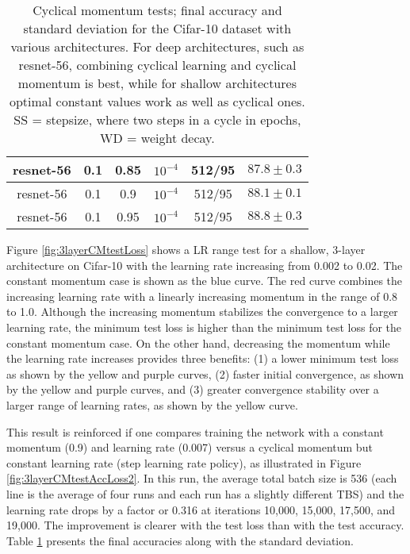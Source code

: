 \documentclass{article} %
\begin{document}
\begin{table}[tb]
\begin{center}
\begin{tabular}{| c | c | c | c | c | c | }
			resnet-56  & 0.1  & 0.85 & $ 10^{-4} $ & 512/95 & $ 87.8 \pm 0.3 $   \\ \hline
			resnet-56  & 0.1  & 0.9 & $ 10^{-4} $ & 512/95 & $ 88.1 \pm 0.1 $   \\ \hline
			resnet-56  & 0.1  & 0.95 & $ 10^{-4} $ & 512/95 & $ 88.8 \pm 0.3 $   \\ \hline
		\end{tabular}
		\caption{Cyclical momentum tests; final accuracy and standard deviation for the Cifar-10 dataset with various architectures. For deep architectures, such as resnet-56, combining cyclical learning and cyclical momentum is best, while for shallow architectures optimal constant values work as well as cyclical ones.   SS = stepsize, where two steps in a cycle in epochs, WD = weight decay. }
		\label{tab1:CMcifar}
		\vspace{-20pt}
	\end{center}
	\vspace{-5pt}
\end{table}

Figure \ref{fig:3layerCMtestLoss} shows a LR range test for a shallow, 3-layer architecture on Cifar-10 with the learning rate increasing from 0.002 to 0.02.  The constant momentum case is shown as the blue curve.  The red curve combines the increasing learning rate with a linearly increasing momentum in the range of 0.8 to 1.0.  Although the increasing momentum stabilizes the convergence to a larger learning rate, the minimum test loss is higher than the minimum test loss for the constant momentum case.  On the other hand, decreasing the momentum while the learning rate increases provides three benefits: (1) a lower minimum test loss as shown by the yellow and purple curves, (2) faster initial convergence, as shown by the yellow and purple curves, and (3) greater convergence stability over a larger range of learning rates, as shown by the yellow curve.

This result is reinforced if one compares training the network with a constant momentum (0.9) and learning rate (0.007) versus a cyclical momentum but constant learning rate (step learning rate policy), as illustrated in Figure \ref{fig:3layerCMtestAccLoss2}.  In this run, the average total batch size is 536 (each line is the average of four runs and each run has a slightly different TBS) and the learning rate drops by a factor or 0.316 at iterations 10,000, 15,000, 17,500, and 19,000.  The improvement is clearer with the test loss than with the test accuracy.  Table \ref*{tab1:CMcifar} presents the final accuracies along with the standard deviation.  
\end{document}
